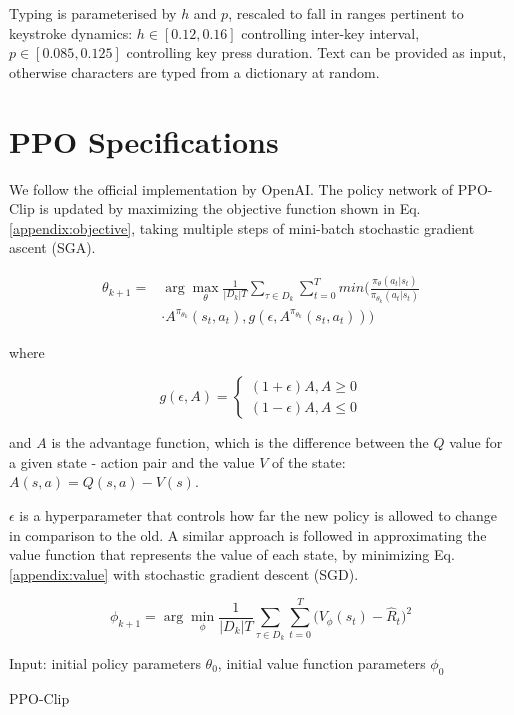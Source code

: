 Typing is parameterised by $h$ and $p$, rescaled to fall in ranges pertinent to keystroke dynamics: $h \in [0.12, 0.16]$ controlling inter-key interval, $p \in [0.085, 0.125]$ controlling key press duration.
Text can be provided as input, otherwise characters are typed from a dictionary at random.

\section{PPO Specifications}
\label{appendix:a}

We follow the official implementation by OpenAI.
The policy network of PPO-Clip is updated by maximizing the objective function shown in Eq. \ref{appendix:objective}, taking multiple steps of mini-batch stochastic gradient ascent (SGA).

\begin{equation}
\begin{aligned}
\theta_{k+1} =& \arg\max_{\theta} \frac{1}{|D_k|T}\sum_{\tau \in D_k}\sum_{t=0}^{T}min\bigg(\frac{\pi_\theta(a_t|s_t)}{\pi_{\theta_k}(a_t|s_t)}\\
& \cdot A^{\pi_{\theta_k}}(s_t,a_t), g(\epsilon, A^{\pi_{\theta_k}}(s_t,a_t))\bigg)
\label{appendix:objective}
\end{aligned}
\end{equation}

where

$$
g(\epsilon, A)=
\begin{cases}
(1+\epsilon)A, A\geq0\\
(1-\epsilon)A, A\leq0
\end{cases}
$$

and $A$ is the advantage function, which is the difference between the $Q$ value for a given state - action pair and the value $V$ of the state: $A(s,a) = Q(s,a) - V(s)$.

$\epsilon$ is a hyperparameter that controls how far the new policy is allowed to change in comparison to the old.
A similar approach is followed in approximating the value function that represents the value of each state, by minimizing Eq. \ref{appendix:value} with stochastic gradient descent (SGD).

\begin{equation}
\phi_{k+1} = \arg\min_{\phi} \frac{1}{|D_k|T}\sum_{\tau \in D_k}\sum_{t=0}^{T}\big(V_\phi(s_t) - \hat{R}_t\big)^2
\label{appendix:value}
\end{equation}

\begin{algorithm}
\SetAlgoLined
 Input: initial policy parameters $\theta_0$, initial value function parameters $\phi_0$\;
 \caption{PPO-Clip}
 \label{alg:PPO-Clip}
\end{algorithm}


